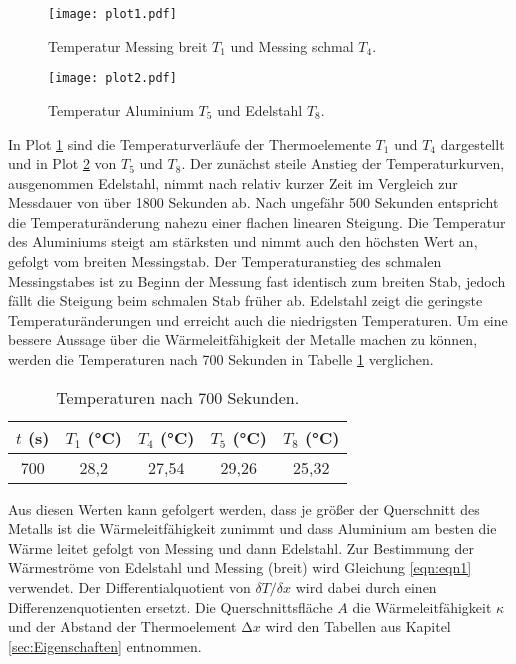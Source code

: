 \begin{figure}
  \centering
  \texttt{[image: plot1.pdf]}
  \caption{Temperatur Messing breit $T_1$ und Messing schmal $T_4$.}
  \label{fig:plot1}
\end{figure}
\begin{figure}
  \centering
  \texttt{[image: plot2.pdf]}
  \caption{Temperatur Aluminium $T_5$ und Edelstahl $T_8$.}
  \label{fig:plot2}
\end{figure}
\noindent
In Plot \ref{fig:plot1} sind die Temperaturverläufe der Thermoelemente $T_1$ und $T_4$ dargestellt und in Plot \ref{fig:plot2} von $T_5$ und $T_8$.
Der zunächst steile Anstieg der Temperaturkurven, ausgenommen Edelstahl, nimmt nach relativ kurzer Zeit im Vergleich zur Messdauer von über 1800 Sekunden ab.
Nach ungefähr 500 Sekunden entspricht die Temperaturänderung nahezu einer flachen linearen Steigung.
Die Temperatur des Aluminiums steigt am stärksten und nimmt auch den höchsten Wert an, gefolgt vom breiten Messingstab.
Der Temperaturanstieg des schmalen Messingstabes ist zu Beginn der Messung fast identisch zum breiten Stab, jedoch fällt die Steigung beim schmalen Stab früher ab.
Edelstahl zeigt die geringste Temperaturänderungen und erreicht auch die niedrigsten Temperaturen.
Um eine bessere Aussage über die Wärmeleitfähigkeit der Metalle machen zu können, werden die Temperaturen nach 700 Sekunden in Tabelle \ref{tab:T700} verglichen.
\begin{table}
  \centering
  \caption{Temperaturen nach 700 Sekunden.}
  \label{tab:T700}
  \begin{tabular}{c c c c c}
    \toprule
    $t$ (\si{\second}) & $T_1$ (\si{\celsius}) & $T_4$ (\si{\celsius}) & $T_5$ (\si{\celsius}) & $T_8$ (\si{\celsius}) \\
    \midrule
    700 & 28,2 & 27,54 & 29,26 & 25,32 \\
    \bottomrule
  \end{tabular}
\end{table}
Aus diesen Werten kann gefolgert werden, dass je größer der Querschnitt des Metalls ist die Wärmeleitfähigkeit zunimmt und dass Aluminium am besten die Wärme leitet gefolgt von Messing und dann Edelstahl.
\FloatBarrier
\noindent
Zur Bestimmung der Wärmeströme von Edelstahl und Messing (breit) wird Gleichung \eqref{eqn:eqn1} verwendet.
Der Differentialquotient von $\delta T / \delta x $ wird dabei durch einen Differenzenquotienten ersetzt.
Die Querschnittsfläche $A$ die Wärmeleitfähigkeit $\kappa$ und der Abstand der Thermoelement $\increment x$ wird den Tabellen aus Kapitel \ref{sec:Eigenschaften} entnommen.
